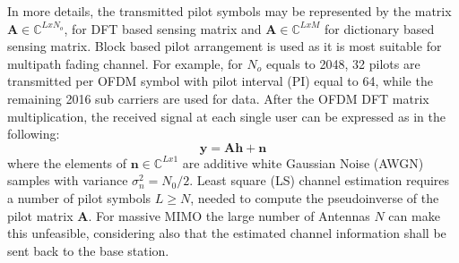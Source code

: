 In more details, the transmitted pilot symbols may be represented by the matrix $\mathbf{A} \in \mathbb{C}^{LxN_o}$, for DFT based sensing matrix and $\mathbf{A} \in \mathbb{C}^{LxM}$ for dictionary based sensing matrix. Block based pilot arrangement is used as it is most suitable for multipath fading channel. For example, for $N_o$ equals to 2048, 32 pilots are transmitted per OFDM symbol with pilot interval (PI) equal to 64, while the remaining 2016 sub carriers are used for data. After the OFDM DFT matrix multiplication, the received signal at each single user can be expressed as in the following:
\begin{equation}
\mathbf{y}=\mathbf{Ah}+\mathbf{n}
\end{equation}
where the elements of $\mathbf{n}\in \mathbb{C}^{Lx1}$ are additive white Gaussian Noise (AWGN) samples with variance $\sigma^2_n=N_0/2$.
Least square (LS) channel estimation requires a number of pilot symbols $L\ge N$, needed to compute the pseudoinverse of the pilot matrix $\mathbf{A}$. For massive MIMO the large number of Antennas $N$ can make this unfeasible, considering also that the estimated channel information shall be sent back to the base station. 

